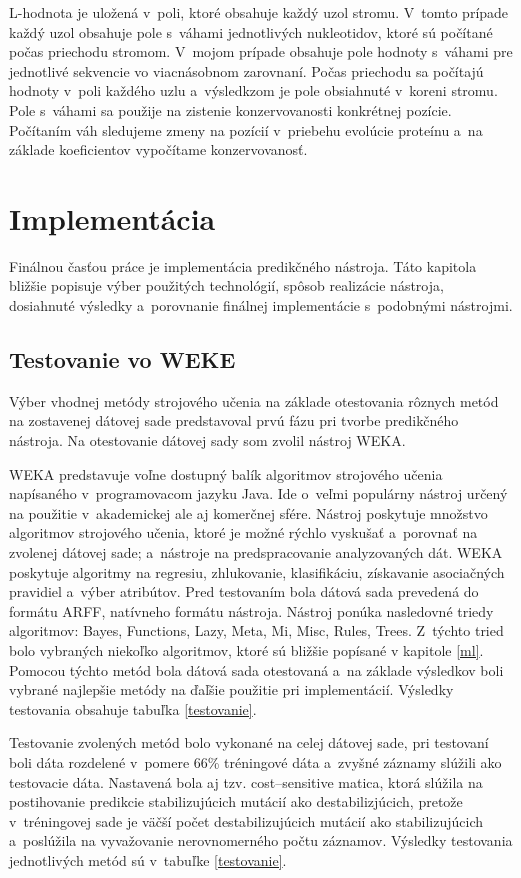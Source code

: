 L-hodnota je uložená v~poli, ktoré obsahuje každý uzol stromu. V~tomto prípade každý uzol obsahuje pole s~váhami jednotlivých nukleotidov, ktoré sú počítané počas priechodu stromom. V~mojom prípade obsahuje pole hodnoty s~váhami pre jednotlivé sekvencie vo viacnásobnom zarovnaní. Počas priechodu sa počítajú hodnoty v~poli každého uzlu a~výsledkzom je pole obsiahnuté v~koreni stromu. Pole s~váhami sa použije na zistenie konzervovanosti konkrétnej pozície. Počítaním váh sledujeme zmeny na pozícií v~priebehu evolúcie proteínu a~na základe koeficientov vypočítame konzervovanosť.

\chapter{Implementácia}
Finálnou časťou práce je implementácia predikčného nástroja. Táto kapitola bližšie popisuje výber použitých technológií, spôsob realizácie nástroja, dosiahnuté výsledky a~porovnanie finálnej implementácie s~podobnými nástrojmi.

\section{Testovanie vo WEKE}
\label{wekatest}
Výber vhodnej metódy strojového učenia na základe otestovania rôznych metód na zostavenej dátovej sade predstavoval prvú fázu pri tvorbe predikčného nástroja. Na otestovanie dátovej sady som zvolil nástroj WEKA.

WEKA \cite{weka} predstavuje voľne dostupný balík algoritmov strojového učenia napísaného v~programovacom jazyku Java. Ide o~veľmi populárny nástroj určený na použitie v~akademickej ale aj komerčnej sfére. Nástroj poskytuje množstvo algoritmov strojového učenia, ktoré je možné rýchlo vyskušať a~porovnať na zvolenej dátovej sade; a~nástroje na predspracovanie analyzovaných dát. WEKA poskytuje algoritmy na regresiu, zhlukovanie, klasifikáciu, získavanie asociačných pravidiel a~výber atribútov.
Pred testovaním bola dátová sada prevedená do formátu ARFF, natívneho formátu nástroja. Nástroj ponúka nasledovné triedy algoritmov: Bayes, Functions, Lazy, Meta, Mi, Misc, Rules, Trees. Z~týchto tried bolo vybraných niekoľko algoritmov, ktoré sú bližšie popísané v kapitole \ref{ml}. Pomocou týchto metód bola dátová sada otestovaná a~na základe výsledkov boli vybrané najlepšie metódy na ďaľšie použitie pri implementácií. Výsledky testovania obsahuje tabuľka \ref{testovanie}.

Testovanie zvolených metód bolo vykonané na celej dátovej sade, pri testovaní boli dáta rozdelené v~pomere 66\% tréningové dáta a~zvyšné záznamy slúžili ako testovacie dáta. Nastavená bola aj tzv. cost--sensitive matica, ktorá slúžila na postihovanie predikcie stabilizujúcich mutácií ako destabilizjúcich, pretože v~tréningovej sade je väčší počet destabilizujúcich mutácií ako stabilizujúcich a~poslúžila na vyvažovanie nerovnomerného počtu záznamov. Výsledky testovania jednotlivých metód sú v~tabuľke \ref{testovanie}. 

